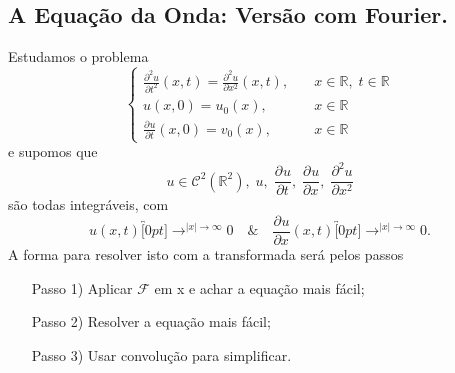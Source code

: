 \documentclass[../pde_notes.tex]{subfiles}
\begin{document}
\subsection{A Equação da Onda: Versão com Fourier.}
Estudamos o problema
\[
	\left\{\begin{array}{ll}
		\frac{\partial^{2}u}{\partial t^{2}}(x, t) = \frac{\partial^{2}u}{\partial x^{2}}(x, t), & \quad x\in \mathbb{R},\; t\in \mathbb{R} \\
		u(x, 0) = u_{0}(x),                                                                      & \quad x\in \mathbb{R}                    \\
		\frac{\partial^{}u}{\partial t^{}}(x, 0) = v_{0}(x),                                     & \quad x\in \mathbb{R}
	\end{array}\right.
\]
e supomos que
\[
	u\in \mathcal{C}^{2}(\mathbb{R}^{2}),\; u,\; \frac{\partial^{}u}{\partial t^{}},\; \frac{\partial^{}u}{\partial x^{}},\; \frac{\partial^{2}u}{\partial x^{2}}
\]
são todas integráveis, com
\[
	u(x, t)\overbracket[0pt]{\longrightarrow}^{|x|\to \infty}0 \quad\&\quad \frac{\partial^{}u}{\partial x^{}}(x, t)\overbracket[0pt]{\longrightarrow}^{|x|\to \infty}0.
\]
A forma para resolver isto com a transformada será pelos passos
\begin{itemize}
	\item[Passo 1)] Aplicar \(\mathcal{F}\) em x e achar a equação mais fácil;
	\item[Passo 2)] Resolver a equação mais fácil;
	\item[Passo 3)] Usar convolução para simplificar.
\end{itemize}
\end{document}

